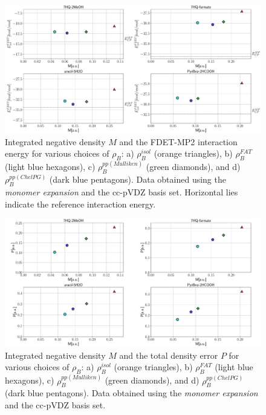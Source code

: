 \documentclass[amsmath,amssymb,preprint,aip,jcp]{revtex4-1}
\begin{document}
\begin{figure}
\centering
\includegraphics[width=1.0\linewidth]{M_vs_MP_ccpVDZ.pdf}
\caption{Integrated negative density $M$ and the FDET-MP2 interaction energy for various choices of $\rho_B$: a) $\rho_B^{isol}$ (orange triangles), b) $\rho_B^{FAT}$ (light blue hexagons), c) $\rho_B^{pp(Mulliken)}$ (green diamonds), and d) $\rho_B^{pp(ChelPG)}$ (dark blue pentagons). Data obtained using the {\it monomer expansion} and the cc-pVDZ basis set. Horizontal lies indicate the reference interaction energy.}
\label{fig:M_vs_MP_ccpVDZ}
\end{figure}

\begin{figure}
\centering
\includegraphics[width=1.0\linewidth]{M_vs_P_ccpVDZ.pdf}
\caption{Integrated negative density $M$ and the total density error $P$ for various choices of $\rho_B$: a) $\rho_B^{isol}$ (orange triangles), b) $\rho_B^{FAT}$ (light blue hexagons), c) $\rho_B^{pp(Mulliken)}$ (green diamonds), and d) $\rho_B^{pp(ChelPG)}$ (dark blue pentagons). Data obtained using the {\it monomer expansion} and the cc-pVDZ basis set.}
\label{fig:M_vs_P_ccpVDZ<}
\end{figure}
\end{document}
